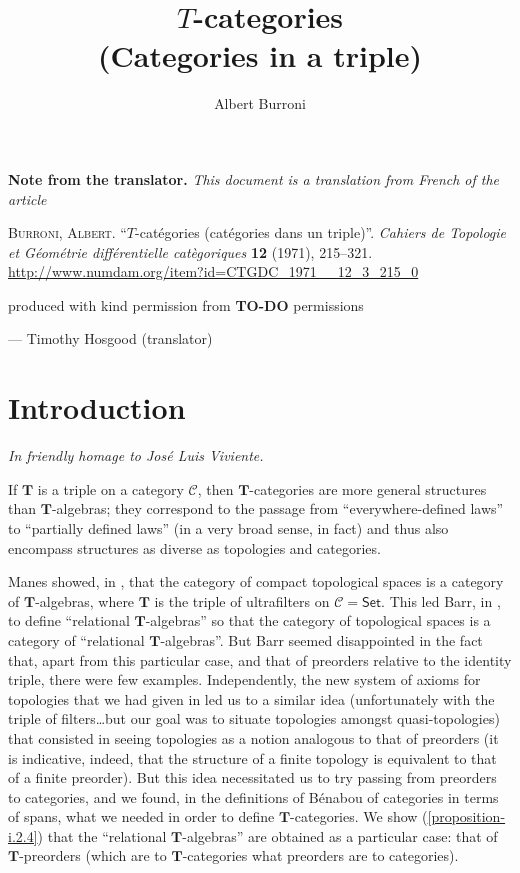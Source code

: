 \documentclass{article}
\title{$T$-categories\\(Categories in a triple)}
\author{Albert Burroni}
\date{}
\newcommand{\origcit}{%
  \textsc{Burroni, Albert.}
  ``$T$-catégories (catégories dans un triple)''.
  \emph{Cahiers de Topologie et Géométrie différentielle catègoriques} \textbf{12} (1971), 215--321.
  {\url{http://www.numdam.org/item?id=CTGDC_1971__12_3_215_0}}
}
\newenvironment{translator}[1]
  {\phantomsection\par\medskip\noindent\small\textbf{#1.}\itshape}
  {\par\medskip}
\newcommand{\oldpage}[1]{\marginpar{\footnotesize$\Big\vert$ \textit{p.~#1}}}
\newcommand{\todo}{{\color{purple}\textbf{TO-DO }}}
\newcommand{\TT}{\mathbf{T}}
\newcommand{\cat}[1]{\mathcal{#1}}
\newcommand{\Cat}[1]{\mathsf{#1}}
\begin{document}
\maketitle

\begin{translator}{Note from the translator}
  This document is a translation from French of the article

  \medskip
  {\normalfont\origcit}

  \medskip
  {\noindent}produced with kind permission from \todo{permissions}
  
  \hfill--- Timothy Hosgood (translator)
\end{translator}



\section*{Introduction}

\hfill\emph{In friendly homage to José Luis Viviente.}

\bigskip

\oldpage{215}
If $\TT$ is a triple on a category $\cat{C}$, then $\TT$-categories are more general structures than $\TT$-algebras; they correspond to the passage from ``everywhere-defined laws'' to ``partially defined laws'' (in a very broad sense, in fact) and thus also encompass structures as diverse as topologies and categories.

Manes showed, in \cite{Ma}, that the category of compact topological spaces is a category of $\TT$-algebras, where $\TT$ is the triple of ultrafilters on $\cat{C}=\Cat{Set}$.
This led Barr, in \cite{Ba}, to define ``relational $\TT$-algebras'' so that the category of topological spaces is a category of ``relational $\TT$-algebras''.
But Barr seemed disappointed in the fact that, apart from this particular case, and that of preorders relative to the identity triple, there were few examples.
Independently, the new system of axioms for topologies that we had given in \cite{Bu} led us to a similar idea (unfortunately with the triple of filters\ldots but our goal was to situate topologies amongst quasi-topologies) that consisted in seeing topologies as a notion analogous to that of preorders (it is indicative, indeed, that the structure of a finite topology is equivalent to that of a finite preorder).
But this idea necessitated us to try passing from preorders to categories, and we found, in the definitions of Bénabou \cite{Be} of categories in terms of spans, what we needed in order to define $\TT$-categories.
We show (\cref{proposition-i.2.4}) that the ``relational $\TT$-algebras'' are obtained as a particular case: that of $\TT$-preorders (which are to $\TT$-categories what preorders are to categories).
\end{document}
